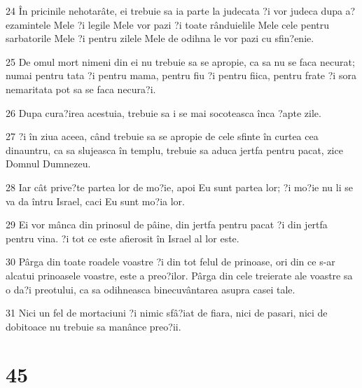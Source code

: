 \par 24 În pricinile nehotarâte, ei trebuie sa ia parte la judecata ?i vor judeca dupa a?ezamintele Mele ?i legile Mele vor pazi ?i toate rânduielile Mele cele pentru sarbatorile Mele ?i pentru zilele Mele de odihna le vor pazi cu sfin?enie.
\par 25 De omul mort nimeni din ei nu trebuie sa se apropie, ca sa nu se faca necurat; numai pentru tata ?i pentru mama, pentru fiu ?i pentru fiica, pentru frate ?i sora nemaritata pot sa se faca necura?i.
\par 26 Dupa cura?irea acestuia, trebuie sa i se mai socoteasca înca ?apte zile.
\par 27 ?i în ziua aceea, când trebuie sa se apropie de cele sfinte în curtea cea dinauntru, ca sa slujeasca în templu, trebuie sa aduca jertfa pentru pacat, zice Domnul Dumnezeu.
\par 28 Iar cât prive?te partea lor de mo?ie, apoi Eu sunt partea lor; ?i mo?ie nu li se va da întru Israel, caci Eu sunt mo?ia lor.
\par 29 Ei vor mânca din prinosul de pâine, din jertfa pentru pacat ?i din jertfa pentru vina. ?i tot ce este afierosit în Israel al lor este.
\par 30 Pârga din toate roadele voastre ?i din tot felul de prinoase, ori din ce s-ar alcatui prinoasele voastre, este a preo?ilor. Pârga din cele treierate ale voastre sa o da?i preotului, ca sa odihneasca binecuvântarea asupra casei tale.
\par 31 Nici un fel de mortaciuni ?i nimic sfâ?iat de fiara, nici de pasari, nici de dobitoace nu trebuie sa manânce preo?ii.

\chapter{45}

